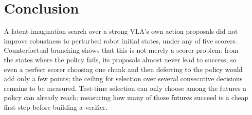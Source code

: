 \documentclass{article}
\begin{document}
\section{Conclusion}
A latent imagination search over a strong VLA's own action proposals did not improve robustness to perturbed robot initial states, under any of five scorers. Counterfactual branching shows that this is not merely a scorer problem: from the states where the policy fails, its proposals almost never lead to success, so even a perfect scorer choosing one chunk and then deferring to the policy would add only a few points; the ceiling for selection over several consecutive decisions remains to be measured. Test-time selection can only choose among the futures a policy can already reach; measuring how many of those futures succeed is a cheap first step before building a verifier.




\end{document}
